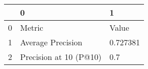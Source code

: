 \begin{tabular}{lll}
\toprule
{} &                       0 &         1 \\
\midrule
0 &                  Metric &     Value \\
1 &       Average Precision &  0.727381 \\
2 &  Precision at 10 (P@10) &       0.7 \\
\bottomrule
\end{tabular}
